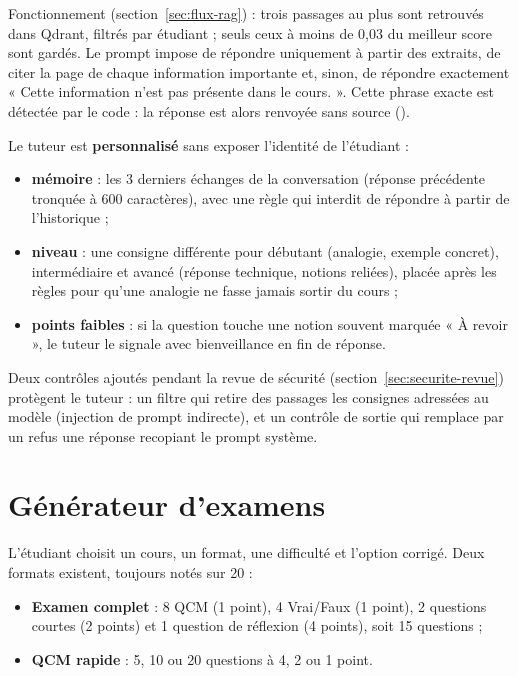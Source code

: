 \documentclass[12pt,a4paper]{report}
\DeclareRobustCommand{\code}[1]{\texttt{\codecasse{#1}}}
\begin{document}
Fonctionnement (section~\ref{sec:flux-rag}) : trois passages au plus sont retrouvés dans Qdrant, filtrés
par étudiant ; seuls ceux à moins de 0,03 du meilleur score sont gardés. Le prompt impose de répondre
uniquement à partir des extraits, de citer la page de chaque information importante et, sinon, de
répondre exactement « Cette information n'est pas présente dans le cours. ». Cette phrase exacte est
détectée par le code : la réponse est alors renvoyée sans source (\code{answered = false}).

Le tuteur est \textbf{personnalisé} sans exposer l'identité de l'étudiant :
\begin{itemize}
  \item \textbf{mémoire} : les 3 derniers échanges de la conversation (réponse précédente tronquée à
        600 caractères), avec une règle qui interdit de répondre à partir de l'historique ;
  \item \textbf{niveau} : une consigne différente pour débutant (analogie, exemple concret),
        intermédiaire et avancé (réponse technique, notions reliées), placée après les règles pour
        qu'une analogie ne fasse jamais sortir du cours ;
  \item \textbf{points faibles} : si la question touche une notion souvent marquée « À revoir », le
        tuteur le signale avec bienveillance en fin de réponse.
\end{itemize}

Deux contrôles ajoutés pendant la revue de sécurité (section~\ref{sec:securite-revue}) protègent le
tuteur : un filtre qui retire des passages les consignes adressées au modèle (injection de prompt
indirecte), et un contrôle de sortie qui remplace par un refus une réponse recopiant le prompt système.

\section{Générateur d'examens}
\label{sec:examens}

L'étudiant choisit un cours, un format, une difficulté et l'option corrigé. Deux formats existent, toujours
notés sur 20 :
\begin{itemize}
  \item \textbf{Examen complet} : 8 QCM (1 point), 4 Vrai/Faux (1 point), 2 questions courtes (2 points)
        et 1 question de réflexion (4 points), soit 15 questions ;
  \item \textbf{QCM rapide} : 5, 10 ou 20 questions à 4, 2 ou 1 point.
\end{itemize}
\end{document}

